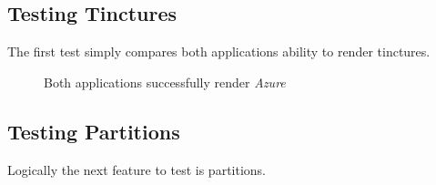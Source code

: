 \subsection{Testing Tinctures}

The first test simply compares both applications ability to render tinctures.

\begin{figure}[H]
\hfill
{}
\hfill
\caption{Both applications successfully render \emph{Azure}}
\end{figure}


\subsection{Testing Partitions}
Logically the next feature to test is partitions. 

